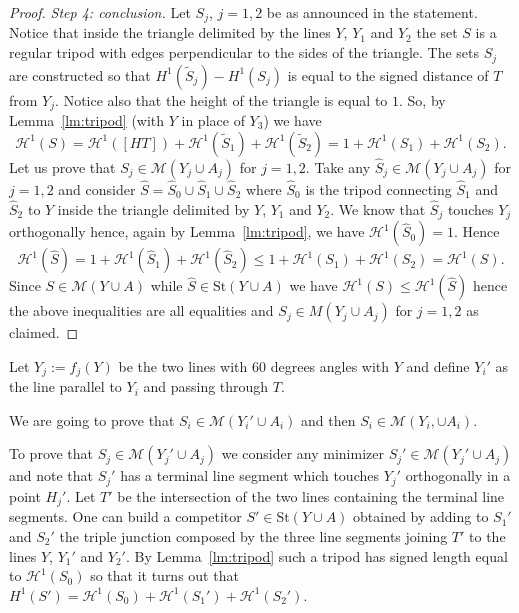 \documentclass{article}
\renewcommand{\H}{\mathcal H}
\newcommand{\St}{\mathrm{St}}
\newcommand{\M}{\mathcal{M}}
\renewcommand{\H}{\mathcal{H}}
\theoremstyle{definition}
\theoremstyle{remark}
\begin{document}
\begin{proof}
\emph{Step 4: conclusion.}
Let $S_j$, $j=1,2$ be as announced in the statement.
Notice that inside the triangle delimited by the lines 
$Y$, $Y_1$ and $Y_2$ the set $S$ is a regular tripod with edges
perpendicular to the sides of the triangle.
The sets $S_j$ are constructed so that $H^1(\tilde S_j) - H^1(S_j)$ 
is equal to the signed distance of $T$ from $Y_j$.
Notice also that the height of the triangle is equal to $1$.
So, by Lemma~\ref{lm:tripod} (with $Y$ in place of $Y_3$) 
we have
\[
\H^1(S) 
  =  \H^1([HT]) + \H^1(\tilde S_1) + \H^1(\tilde S_2) 
  = 1 + \H^1(S_1) + \H^1(S_2).
\]
Let us prove that $S_j\in \M(Y_j\cup A_j)$ for $j=1,2$.
Take any $\hat S_j\in \M(Y_j\cup A_j)$ 
for $j=1,2$ and consider $\hat S = \hat S_0 \cup \hat S_1 \cup \hat S_2$
where $\hat S_0$ is the tripod connecting $\hat S_1$ and $\hat S_2$ 
to $Y$ inside the triangle delimited by $Y$, $Y_1$ and $Y_2$.
We know that $\hat S_j$ touches $Y_j$ orthogonally hence,
again by Lemma~\ref{lm:tripod}, we have
$\H^1(\hat S_0) = 1$. Hence
\[
    \H^1(\hat S) 
    = 1 + \H^1(\hat S_1) + \H^1(\hat S_2)
    \le 1 + \H^1(S_1) + \H^1(S_2) = \H^1(S).
\]
Since $S\in \M(Y\cup A)$ while $\hat S \in \St(Y\cup A)$ we 
have $\H^1(S) \le \H^1(\hat S)$ hence the above inequalities 
are all equalities and $S_j\in M(Y_j\cup A_j)$ for $j=1,2$ as claimed.
\end{proof}














Let $Y_j:=f_j(Y)$ be the two lines with 60 degrees angles
with $Y$ and define $Y_i'$ as the line 
parallel to $Y_i$ and passing through $T$.

We are going to prove that $S_i\in \M(Y_i'\cup A_i)$ 
and then $S_i\in \M(Y_i,\cup A_i)$.

To prove that $S_j\in \M(Y_j'\cup A_j)$ we consider 
any minimizer $S_j' \in \M(Y_j'\cup A_j)$ 
and note that $S_j'$ has a terminal line segment
which touches $Y_j'$ orthogonally 
in a point $H_j'$. 
Let $T'$ be the intersection of the two lines 
containing the terminal line segments.
One can build a competitor $S'\in \St(Y\cup A)$
obtained by adding to $S_1'$ and $S_2'$ the triple 
junction composed by the three line segments joining 
$T'$ to the lines $Y$, $Y_1'$ and $Y_2'$.
By Lemma~\ref{lm:tripod} such a tripod 
has signed length equal to $\H^1(S_0)$
so that it turns out that 
$H^1(S') = \H^1(S_0) + \H^1(S_1') + \H^1(S_2')$.
\end{document}
